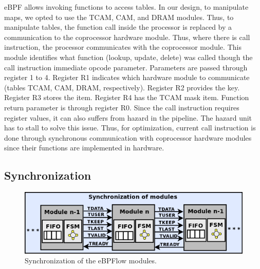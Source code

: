 
eBPF allows invoking functions to access tables.
In our design, to manipulate maps, we opted to use the TCAM, CAM, and DRAM modules.
Thus, to manipulate tables, the function call inside the processor is replaced by a communication to the coprocessor hardware module. 
Thus, where there is call instruction, the processor communicates with the coprocessor module.
This module identifies what function (lookup, update, delete) was called though the call instruction immediate opcode parameter. 
Parameters are passed through register 1 to 4.
Register R1 indicates which hardware module to communicate (tables TCAM, CAM, DRAM, respectively).
Register R2 provides the key.
Register R3 stores the item.
Register R4 has the TCAM mask item.
Function return parameter is through register R0.
Since the call instruction requires register values, it can also suffers from hazard in the pipeline. The hazard unit has to stall to solve this issue.
Thus, for optimization, current call instruction is done through synchronous communication with coprocessor hardware modules since their functions are implemented in hardware.

\subsection{Synchronization}

\begin{figure}[tb]
\centering
\includegraphics[width=\linewidth]{figures/06_fig04.png}
\caption{Synchronization of the eBPFlow modules.}
\label{fig:06_fig04}
\end{figure}

